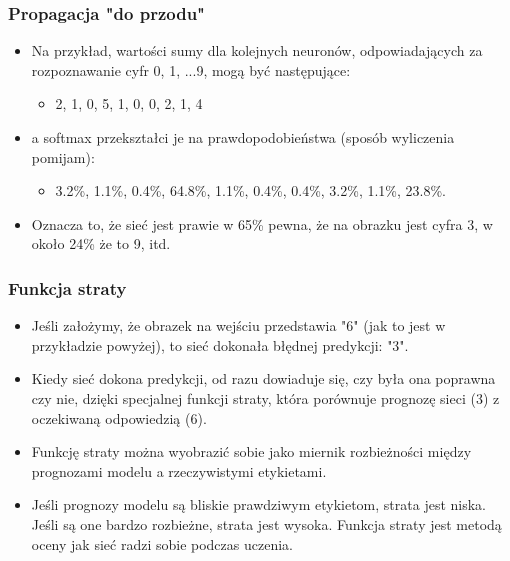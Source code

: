 \documentclass{beamer}
\begin{document}
\begin{frame}[fragile]
\frametitle{Propagacja "do przodu"}
\begin{itemize}
\item Na przykład, wartości sumy dla kolejnych neuronów, odpowiadających za rozpoznawanie cyfr 0, 1, ...9, mogą być następujące:
	\begin{itemize}
	\item 2, 1, 0, 5, 1, 0, 0, 2, 1, 4
	\end{itemize}
\item a softmax przekształci je na prawdopodobieństwa (sposób wyliczenia pomijam): 
	\begin{itemize}
	\item 3.2\%, 1.1\%, 0.4\%, 64.8\%, 1.1\%, 0.4\%, 0.4\%, 3.2\%, 1.1\%, 23.8\%.
	\end{itemize}
\item Oznacza to, że sieć jest prawie w 65\% pewna, że na obrazku jest cyfra 3, w około 24\% że to 9, itd. 
\end{itemize}
\end{frame}

\begin{frame}[fragile]
\frametitle{Funkcja straty}
\begin{itemize}
\item Jeśli założymy, że obrazek na wejściu przedstawia "6" (jak to jest w przykładzie powyżej), to sieć dokonała błędnej predykcji: "3".
\item Kiedy sieć dokona predykcji, od razu dowiaduje się, czy była ona poprawna czy nie, dzięki specjalnej funkcji straty, która porównuje prognozę sieci (3) z oczekiwaną odpowiedzią (6). 
\item Funkcję straty można wyobrazić sobie jako miernik rozbieżności między prognozami modelu a rzeczywistymi etykietami. 
\item Jeśli prognozy modelu są bliskie prawdziwym etykietom, strata jest niska. Jeśli są one bardzo rozbieżne, strata jest wysoka. Funkcja straty jest metodą oceny jak sieć radzi sobie podczas uczenia. 
\end{itemize}
\end{frame}
\end{document}
